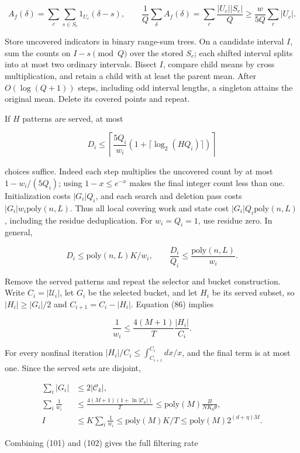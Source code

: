 \[
A_f(\delta)=\sum_c\sum_{s\in S_c}1_{U_c}(\delta-s),
\qquad
\frac1Q\sum_\delta A_f(\delta)
=\sum_c\frac{|U_c||S_c|}{Q}
\ge\frac{w}{5Q}\sum_c|U_c|.
\tag{99}
\]

Store uncovered indicators in binary range-sum trees. On a candidate interval \(I\), sum the counts on \(I-s\pmod Q\) over the stored \(S_c\); each shifted interval splits into at most two ordinary intervals. Bisect \(I\), compare child means by cross multiplication, and retain a child with at least the parent mean. After \(O(\log(Q+1))\) steps, including odd interval lengths, a singleton attains the original mean. Delete its covered points and repeat.

If \(H\) patterns are served, at most

\[
D_i\le\left\lceil\frac{5Q_i}{w_i}
\left(1+\lceil\log_2(HQ_i)\rceil\right)\right\rceil
\tag{100}
\]

choices suffice. Indeed each step multiplies the uncovered count by at most \(1-w_i/(5Q_i)\); using \(1-x\le e^{-x}\) makes the final integer count less than one. Initialization costs \(|G_i|Q_i\), and each search and deletion pass costs \(|G_i|w_i\mathrm{poly}(n,L)\). Thus all local covering work and state cost \(|G_i|Q_i\mathrm{poly}(n,L)\), including the residue deduplication. For \(w_i=Q_i=1\), use residue zero. In general,

\[
D_i\le\mathrm{poly}(n,L)K/w_i,\qquad
\frac{D_i}{Q_i}\le\frac{\mathrm{poly}(n,L)}{w_i}.
\tag{101}
\]

Remove the served patterns and repeat the selector and bucket construction. Write \(C_i=|\mathcal U_i|\), let \(G_i\) be the selected bucket, and let \(H_i\) be its served subset, so \(|H_i|\ge|G_i|/2\) and \(C_{i+1}=C_i-|H_i|\). Equation (86) implies

\[
\frac1{w_i}\le\frac{4(M+1)}T\frac{|H_i|}{C_i}.
\]

For every nonfinal iteration \(|H_i|/C_i\le\int_{C_{i+1}}^{C_i}dx/x\), and the final term is at most one. Since the served sets are disjoint,

\[
\begin{aligned}
\sum_i|G_i|&\le2|\mathcal C_k|,\\
\sum_i\frac1{w_i}&\le\frac{4(M+1)(1+\ln|\mathcal C_k|)}T
\le\mathrm{poly}(M)\frac{B}{NK_0\theta},\\
I&\le K\sum_i\frac1{w_i}
\le\mathrm{poly}(M)K/T
\le\mathrm{poly}(M)2^{(d+\eta)M}.
\end{aligned}
\tag{102}
\]

Combining (101) and (102) gives the full filtering rate

